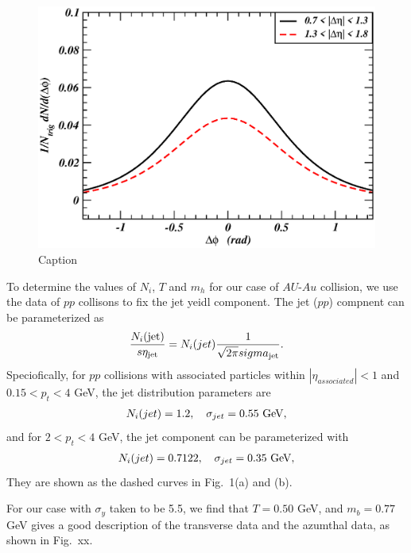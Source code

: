 \documentclass[showpacs,preprintnumbers,amsmath,amssymb,floatfix]{revtex4}
\begin{document}
\begin{figure} [h]
\includegraphics[angle=0,scale=0.50]{pkdendndfitheo}
\vspace*{0.0cm}
\caption{ Caption 
}
\end{figure}


To determine the values of $N_i$, $T$ and $m_h$ for our case of
$AU$-$Au$ collision, we use the data of $pp$ collisons to fix the jet
yeidl component. 
The jet ($pp$) 
compnent can be parameterized as
\begin{eqnarray}
\frac{N_i({\rm jet})}{s\eta_{\rm jet}}
=N_i(jet) \frac{1}{\sqrt{2\pi}sigma_{\rm jet}}.
\end{eqnarray}
Speciofically, for $pp$ collisions with associated particles within
$|\eta_{associated}|<1$ and $0.15 < p_t < 4$ GeV, the jet distribution
parameters are
\begin{eqnarray}
N_i(jet)=1.2, ~~~ \sigma_{jet}=0.55 {\rm ~ GeV},
\end{eqnarray}
and for  $2 < p_t < 4$ GeV, the jet component can be parameterized with
\begin{eqnarray}
N_i(jet)=0.7122, ~~~ \sigma_{jet}=0.35 {\rm ~GeV},
\end{eqnarray}
They are shown as the dashed curves in Fig.\ 1(a) and (b).

For our case with $\sigma_y$ taken to be 5.5, we find that $T=0.50$
GeV, and $m_b=0.77$ GeV gives a good description of the transverse
data and the azumthal data, as shown in Fig.\ xx.
\end{document}
